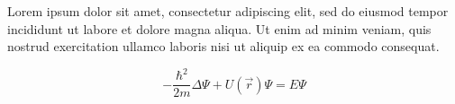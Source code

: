 Lorem ipsum dolor sit amet, consectetur adipiscing elit, sed do eiusmod tempor incididunt ut labore et dolore magna aliqua. Ut enim ad minim veniam, quis nostrud exercitation ullamco laboris nisi ut aliquip ex ea commodo consequat.



$$-\frac{\hbar^2}{2m} \Delta \Psi + U(\vec{r}) \Psi = E \Psi $$